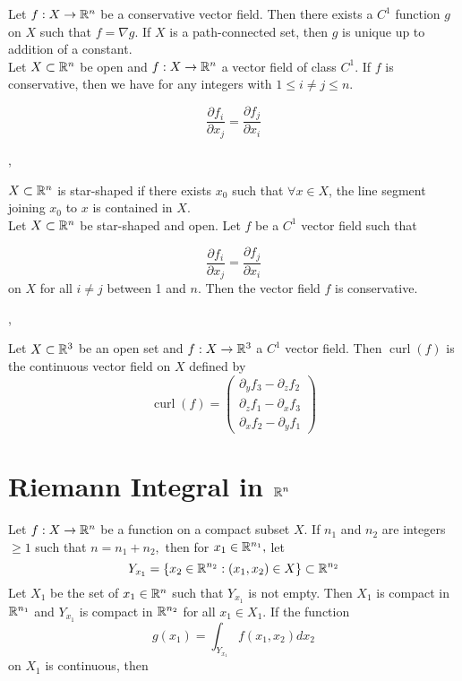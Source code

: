 \Theorem [Potential] Let $f: X \rightarrow \mathbb{R}^{n}$ be a conservative vector field. Then there exists a $C^{1}$ function $g$ on $X$ such that $f=\nabla g$.
If $X$ is a path-connected set, then $g$ is unique up to addition of a constant.
\\

\Prop [4.1.13] Let $X \subset \mathbb{R}^{n}$ be open and $f: X \rightarrow \mathbb{R}^{n}$ a vector field of class $C^{1}$.
If $f$ is conservative, then we have for any integers with $1 \leqslant i \neq j \leqslant n$.

$$
\frac{\partial f_{i}}{\partial x_{j}}=\frac{\partial f_{j}}{\partial x_{i}}
$$

\sep

 $X \subset \mathbb{R}^n$ is star-shaped if there exists $x_0$ such that $\forall x \in X$, the line segment joining $x_0$ to $x$ is contained in $X$.
\\

\Theorem[4.1.17] Let $X \subset \mathbb{R}^n$ be star-shaped and open. Let $f$ be a $C^{1}$ vector field such that

$$
\frac{\partial f_{i}}{\partial x_{j}}=\frac{\partial f_{j}}{\partial x_{i}}
$$
on $X$ for all $i \neq j$ between 1 and $n .$ Then the vector field $f$ is conservative.

\sep

\Def [Curl] Let $X \subset \mathbb{R}^{3}$ be an open set and $f: X \rightarrow \mathbb{R}^{3}$ a $C^{1}$ vector field. Then 
$\operatorname{curl}(f)$ is the continuous vector field on $X$ defined by
$$
\operatorname{curl}(f)=\left(\begin{array}{l}
\partial_{y} f_{3}-\partial_{z} f_{2} \\
\partial_{z} f_{1}-\partial_{x} f_{3} \\
\partial_{x} f_{2}-\partial_{y} f_{1}
\end{array}\right)
$$

\section{Riemann Integral in $\mathbb{R}^n$}

\Theorem[Fubini] Let $f: X \rightarrow \mathbb{R}^{n}$ be a function on a compact subset $X$. If $n_{1}$ and $n_{2}$ are integers $\geqslant 1$ such that $n=n_{1}+n_{2},$ then for $x_{1} \in \mathbb{R}^{n_{1}},$ let
$$
Y_{x_{1}}=\left\{x_{2} \in \mathbb{R}^{n_{2}}:\left(x_{1}, x_{2}\right) \in X\right\} \subset \mathbb{R}^{n_{2}}
$$
Let $X_{1}$ be the set of $x_{1} \in \mathbb{R}^{n}$ such that $Y_{x_{1}}$ is not empty. Then $X_{1}$ is compact in $\mathbb{R}^{n_{1}}$ and $Y_{x_{1}}$ is compact in $\mathbb{R}^{n_{2}}$ for all $x_{1} \in X_{1} .$ If the function
$$
g\left(x_{1}\right)=\int_{Y_{x_{1}}} f\left(x_{1}, x_{2}\right) d x_{2}
$$
on $X_{1}$ is continuous, then


